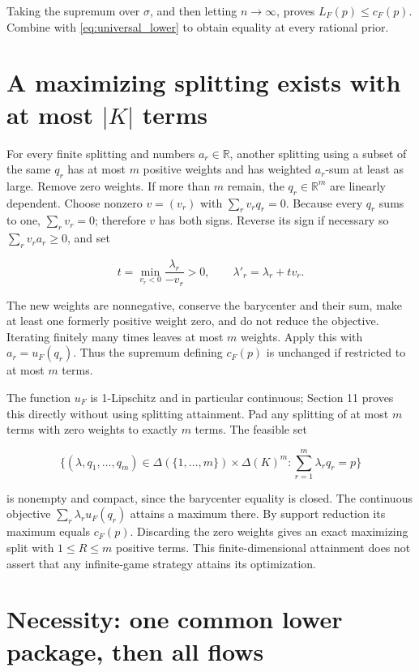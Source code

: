 \documentclass[11pt,a4paper]{article}
\begin{document}
Taking the supremum over \(\sigma\), and then letting \(n\to\infty\), proves \(L_F(p)\le c_F(p)\). Combine with \eqref{eq:universal_lower} to obtain equality at every rational prior.

\section{A maximizing splitting exists with at most \texorpdfstring{\(|K|\)}{|K|} terms}

For every finite splitting and numbers \(a_r\in\mathbb R\), another splitting using a subset of the same \(q_r\) has at most \(m\) positive weights and has weighted \(a_r\)-sum at least as large. Remove zero weights. If more than \(m\) remain, the \(q_r\in\mathbb R^m\) are linearly dependent. Choose nonzero \(v=(v_r)\) with \(\sum_r v_rq_r=0\). Because every \(q_r\) sums to one, \(\sum_r v_r=0\); therefore \(v\) has both signs. Reverse its sign if necessary so \(\sum_rv_ra_r\ge0\), and set

\[
t=\min_{v_r<0}\frac{\lambda_r}{-v_r}>0,\qquad
\lambda'_r=\lambda_r+tv_r.
\]

The new weights are nonnegative, conserve the barycenter and their sum, make at least one formerly positive weight zero, and do not reduce the objective. Iterating finitely many times leaves at most \(m\) weights. Apply this with \(a_r=u_F(q_r)\). Thus the supremum defining \(c_F(p)\) is unchanged if restricted to at most \(m\) terms.

The function \(u_F\) is 1-Lipschitz and in particular continuous; Section 11 proves this directly without using splitting attainment. Pad any splitting of at most \(m\) terms with zero weights to exactly \(m\) terms. The feasible set

\[
\{(\lambda,q_1,\ldots,q_m)\in\Delta(\{1,\ldots,m\})\times\Delta(K)^m:
\sum_{r=1}^m\lambda_rq_r=p\}
\]

is nonempty and compact, since the barycenter equality is closed. The continuous objective \(\sum_r\lambda_ru_F(q_r)\) attains a maximum there. By support reduction its maximum equals \(c_F(p)\). Discarding the zero weights gives an exact maximizing split with \(1\le R\le m\) positive terms. This finite-dimensional attainment does not assert that any infinite-game strategy attains its optimization.

\section{Necessity: one common lower package, then all flows}
\end{document}
